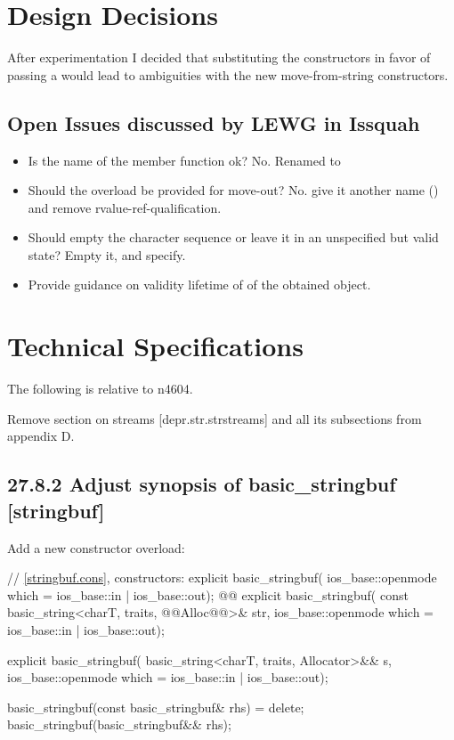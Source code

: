 \documentclass[ebook,11pt,article]{memoir}
\begin{document}
\chapter{Design Decisions}
After experimentation I decided that substituting the  constructors in favor of passing a  would lead to ambiguities with the new move-from-string constructors.
\section{Open Issues discussed by LEWG in Issquah}
\begin{itemize}
\item Is the name of the  member function ok? No. Renamed to 
\item Should the  overload be provided for move-out? No. give it another name () and remove rvalue-ref-qualification.
\item Should  empty the character sequence or leave it in an unspecified but valid state? Empty it, and specify.
\item Provide guidance on validity lifetime of of the obtained  object.
\end{itemize}

\chapter{Technical Specifications}
The following is relative to n4604.

Remove section on  streams [depr.str.strstreams] and all its subsections from appendix D.

\section{27.8.2 Adjust synopsis of basic\_stringbuf [stringbuf]}
Add a new constructor overload:
\begin{codeblock}
    // \ref{stringbuf.cons}, constructors:
    explicit basic_stringbuf(
      ios_base::openmode which = ios_base::in | ios_base::out);
    @@
    explicit basic_stringbuf(
      const basic_string<charT, traits, @@Alloc@@>& str,
      ios_base::openmode which = ios_base::in | ios_base::out);
\end{codeblock}
\begin{addedblock}\begin{codeblock}
    explicit basic_stringbuf(
      basic_string<charT, traits, Allocator>&& s,
      ios_base::openmode which = ios_base::in | ios_base::out);
\end{codeblock}\end{addedblock}
\begin{codeblock}
    basic_stringbuf(const basic_stringbuf& rhs) = delete;
    basic_stringbuf(basic_stringbuf&& rhs);
\end{codeblock}
\end{document}
